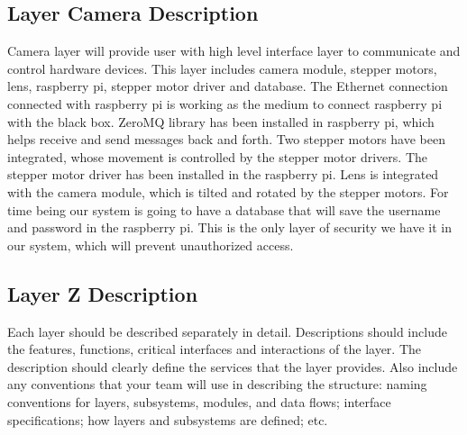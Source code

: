 \subsection{Layer Camera Description}
Camera layer will provide user with high level interface layer to communicate and control hardware devices. This layer includes camera module, stepper motors, lens, raspberry pi, stepper motor driver and database. The Ethernet connection connected with raspberry pi is working as the medium to connect raspberry pi with the black box. ZeroMQ library has been installed in raspberry pi, which helps receive and send messages back and forth. Two stepper motors have been integrated, whose movement is controlled by the stepper motor drivers. The stepper motor driver has been installed in the raspberry pi. Lens is integrated with the camera module, which is tilted and rotated by the stepper motors. For time being our system is going to have a database that will save the username and password in the raspberry pi. This is the only layer of security we have it in our system, which will prevent unauthorized access.




\subsection{Layer Z Description}
Each layer should be described separately in detail. Descriptions should include the features, functions, critical interfaces and interactions of the layer. The description should clearly define the services that the layer provides. Also include any conventions that your team will use in describing the structure: naming conventions for layers, subsystems, modules, and data flows; interface specifications; how layers and subsystems are defined; etc. 
